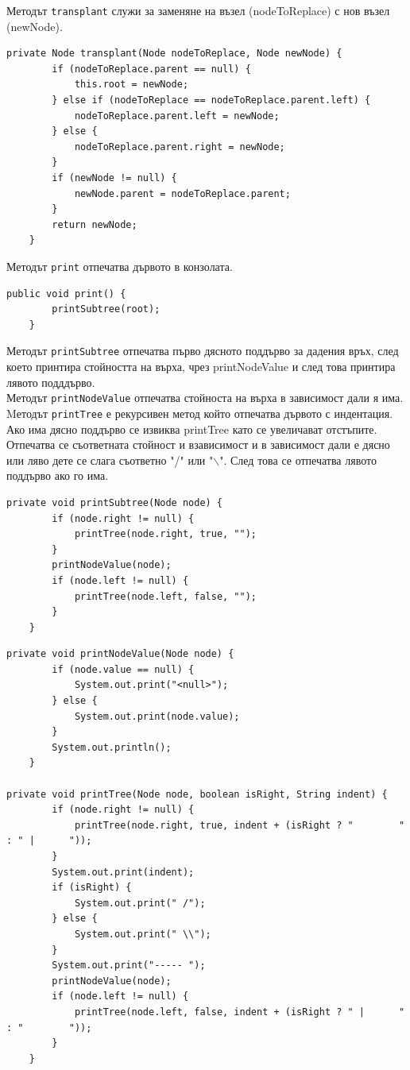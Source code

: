 \documentclass[a4paper,fleqn,12pt]{article}
\begin{document}
\noindent
Методът \texttt{transplant} служи за заменяне на възел (nodeToReplace) с нов възел (newNode).
\begin{lstlisting}
private Node transplant(Node nodeToReplace, Node newNode) {
        if (nodeToReplace.parent == null) {
            this.root = newNode;
        } else if (nodeToReplace == nodeToReplace.parent.left) {
            nodeToReplace.parent.left = newNode;
        } else {
            nodeToReplace.parent.right = newNode;
        }
        if (newNode != null) {
            newNode.parent = nodeToReplace.parent;
        }
        return newNode;
    }
\end{lstlisting}
Методът \texttt{print} отпечатва дървото в конзолата.
\begin{lstlisting}
public void print() {
        printSubtree(root);
    }
\end{lstlisting}
Методът \texttt{printSubtree} отпечатва първо дясното поддърво за дадения връх, след което принтира стойността на върха, чрез printNodeValue и след това принтира лявото подддърво. \\
Методът \texttt{printNodeValue} отпечатва стойноста на върха в зависимост дали я има. \\
Mетодът \texttt{printTree} е рекурсивен метод който отпечатва дървото с индентация. 
Ако има дясно поддърво се извиква printTree като се увеличават отстъпите. 
Отпечатва се съответната стойност и взависимост и в зависимост дали е дясно или ляво дете се слага съответно "/" или "$\backslash$". 
След това се отпечатва лявото поддърво ако го има. 
\begin{lstlisting}
private void printSubtree(Node node) {
        if (node.right != null) {
            printTree(node.right, true, "");
        }
        printNodeValue(node);
        if (node.left != null) {
            printTree(node.left, false, "");
        }
    }
\end{lstlisting}

\begin{lstlisting}
private void printNodeValue(Node node) {
        if (node.value == null) {
            System.out.print("<null>");
        } else {
            System.out.print(node.value);
        }
        System.out.println();
    }

private void printTree(Node node, boolean isRight, String indent) {
        if (node.right != null) {
            printTree(node.right, true, indent + (isRight ? "        " : " |      "));
        }
        System.out.print(indent);
        if (isRight) {
            System.out.print(" /");
        } else {
            System.out.print(" \\");
        }
        System.out.print("----- ");
        printNodeValue(node);
        if (node.left != null) {
            printTree(node.left, false, indent + (isRight ? " |      " : "        "));
        }
    }
\end{lstlisting}
\end{document}
